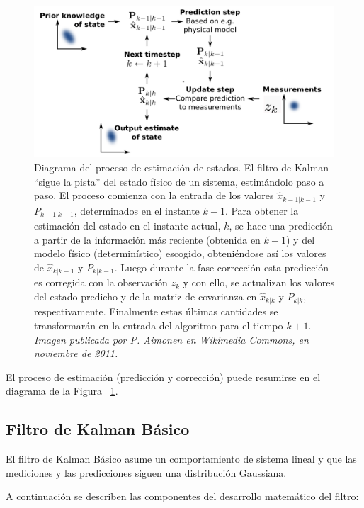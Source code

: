 \begin{figure}
\centering
\includegraphics[scale=.2]{images/diag_kalman}
\caption{Diagrama del proceso de estimaci\'on de estados. El filtro de Kalman ``sigue la pista'' del estado f\'isico de un sistema, estim\'andolo paso a paso. El proceso comienza con la entrada de los valores $\hat{x}_{k-1|k-1}$ y $P_{k-1|k-1}$, determinados en el instante $k-1$. Para obtener la estimaci\'on del estado en el instante actual, $k$, se hace una predicci\'on a partir de la informaci\'on m\'as reciente (obtenida en $k-1$) y del modelo f\'isico (determin\'istico) escogido, obteni\'endose as\'i los valores de $\hat{x}_{k|k-1}$ y $P_{k|k-1}$. Luego durante la fase correcci\'on esta predicci\'on es corregida con la observaci\'on $z_k$ y con ello, se actualizan los valores del estado predicho y de la matriz de covarianza en $\hat{x}_{k|k}$ y $P_{k|k}$, respectivamente. Finalmente estas \'ultimas cantidades se transformar\'an en la entrada del algoritmo para el tiempo $k+1$. \textit{Imagen publicada por P. Aimonen en Wikimedia Commons, en noviembre de 2011.}}
\label{fig:diag}
\end{figure} 
 
El proceso de estimaci\'on (predicci\'on y correcci\'on) puede resumirse en el diagrama de la Figura ~\ref{fig:diag}. 
 
\subsection{Filtro de Kalman B\'asico}
El filtro de Kalman B\'asico \cite{kalman} asume un comportamiento de sistema lineal y que las mediciones y las predicciones siguen una distribuci\'on Gaussiana. 
\bigskip

A continuaci\'on se describen las componentes del desarrollo matem\'atico del filtro:

